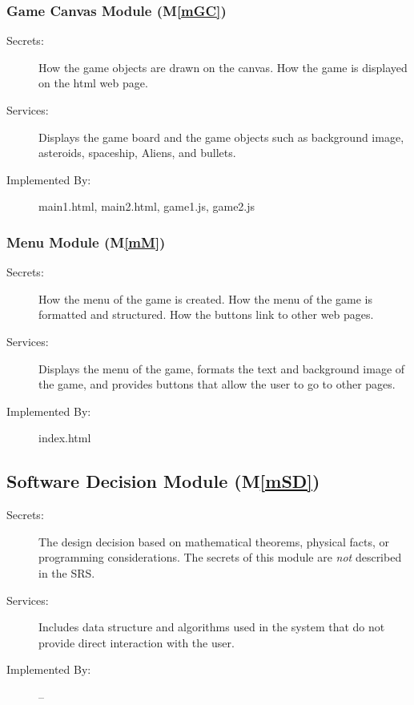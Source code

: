 \documentclass[12pt, titlepage]{article}
\newcommand{\mref}[1]{M\ref{#1}}
\begin{document}
\subsubsection{Game Canvas Module (\mref{mGC})}

\begin{description}
\item[Secrets:]How the game objects are drawn on the canvas. How the game is displayed on the html web page.
\item[Services:]Displays the game board and the game objects such as background image, asteroids, spaceship, Aliens, and bullets.
\item[Implemented By:] main1.html, main2.html, game1.js, game2.js
\end{description}

\subsubsection{Menu Module  (\mref{mM})}

\begin{description}
\item[Secrets:]How the menu of the game is created. How the menu of the game is formatted and structured. How the buttons link to other web pages.
\item[Services:]Displays the menu of the game, formats the text and background image of the game, and provides buttons that allow the user to go to other pages.
\item[Implemented By:] index.html
\end{description}

\subsection{Software Decision Module (\mref{mSD})}

\begin{description}
\item[Secrets:] The design decision based on mathematical theorems, physical
  facts, or programming considerations. The secrets of this module are
  \emph{not} described in the SRS.
\item[Services:] Includes data structure and algorithms used in the system that
  do not provide direct interaction with the user. 
\item[Implemented By:] --
\end{description}
\end{document}
